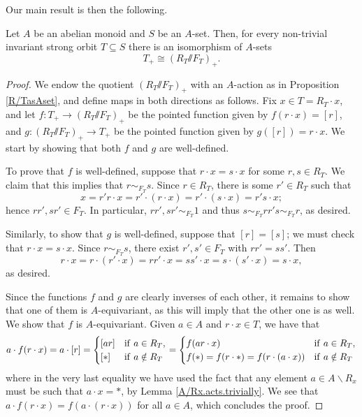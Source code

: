 \documentclass[11pt]{amsart}
\renewcommand{\ss}{\mathord{\sslash}}
\begin{document}
Our main result is then the following.

\begin{theorem}\label{ambit-stabilizer}
    Let $A$ be an abelian monoid and $S$ be an $A$-set. Then, for every  non-trivial invariant strong orbit $T\subseteq S$ there is an isomorphism of $A$-sets $$T_+\cong (R_T\ss F_T)_+.$$
\end{theorem}
\begin{proof}
    We endow the quotient $(R_T\ss F_T)_+$ with an $A$-action as in Proposition \ref{R/TasAset}, and define maps in both directions as follows. Fix $x\in T=R_T\cdot x$, and let $f\colon T_+\to (R_T\ss F_T)_+$ be the pointed function given by $f(r\cdot x)=[r]$, and $g\colon (R_T\ss F_T)_+\to T_+$ be the pointed function given by $g([r])=r\cdot x$. We start by showing that both $f$ and $g$ are well-defined.

    To prove that $f$ is well-defined, suppose that $r\cdot x = s\cdot x$ for some $r,s\in R_T$.  We claim that this implies that $r\sim_{F_T} s$. Since $r\in R_T$, there is some $r'\in R_T$ such that \[x=r'r\cdot x = r'\cdot (r\cdot x)=r'\cdot (s\cdot x)=r's\cdot x;\] hence $rr',sr'\in F_T$.  In particular, $rr',sr' \sim_{F_T} 1$ and thus $s \sim_{F_T} rr's \sim_{F_T} r$, as desired.  
    
    Similarly, to show that $g$ is well-defined, suppose that $[r]=[s]$; we must check that $r\cdot x=s\cdot x$. Since $r\sim_{F_T} s$, there exist $r',s'\in F_T$ with $rr'=ss'$. Then \[r\cdot x=r\cdot (r'\cdot x)=rr'\cdot x=ss'\cdot x=s\cdot(s'\cdot x)=s\cdot x,\] as desired.
    
    Since the functions $f$ and $g$ are clearly inverses of each other, it remains to show that one of them is $A$-equivariant, as this will imply that the other one is as well.  We show that $f$ is $A$-equivariant. Given $a\in A$ and $r\cdot x\in T$, we have that
 \[a\cdot f(r\cdot x)=a \cdot [r] = \begin{cases}
            [ar] &\mathrm{if}\  a \in R_T, \\
            [*] &\mathrm{if}\  a \notin R_T
    \end{cases}= \begin{cases}
            f(ar\cdot x) &\mathrm{if}\  a \in R_T, \\
            f(*)=f(r\cdot *)=f(r\cdot(a\cdot x)) &\mathrm{if}\  a \notin R_T
    \end{cases}\]
    where in the very last equality we have used the fact that any element $a\in A\backslash R_x$ must be such that $a\cdot x=*$, by Lemma \ref{A/Rx.acts.trivially}. We see that $a\cdot f(r\cdot x)=f(a\cdot(r\cdot x))$ for all $a\in A$, which concludes the proof.
\end{proof}
\end{document}

